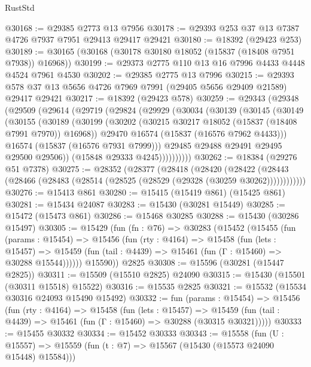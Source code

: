 \begin{lexlean}{RustStd}
\begin{coremodule}
{\begin{coremodule}
{{{{{{{{{{{{{{{{{{{{{{{{{{{{{{{{{{{{{{{{{{{{{{{{{{{{{{{{{{{{@30168 := @29385 @2773 @13 @7956
@30178 := @29393 @253 @37 @13 @7387 @4726 @7937 @7951 @29413 @29417 @29421
@30180 := @18392 (@29423 @253)
@30189 := @30165 (@30168 (@30178 @30180 @18052 (@15837 (@18408 @7951 @7938)) @16968))
@30199 := @29373 @2775 @110 @13 @16 @7996 @4433 @4448 @4524 @7961 @4530
@30202 := @29385 @2775 @13 @7996
@30215 := @29393 @578 @37 @13 @5656 @4726 @7969 @7991 (@29405 @5656 @29409 @21589) @29417 @29421
@30217 := @18392 (@29423 @578)
@30259 := @29343
    (@29348
      (@29509
        (@29614
          (@29719
            (@29824
              (@29929
                (@30034
                  (@30139
                    (@30145
                      (@30149
                        (@30155
                          (@30189
                            (@30199
                              (@30202 (@30215 @30217 @18052 (@15837 (@18408 @7991 @7970)) @16968))
                              @29470
                              @16574
                              (@15837 (@16576 @7962 @4433)))
                            @16574
                            (@15837 (@16576 @7931 @7999)))
                          @29485
                          @29488
                          @29491
                          @29495
                          @29500
                          @29506))
                      (@15848 @29333 @4245))))))))))
@30262 := @18384 (@29276 @51 @7378)
@30275 := @28352
    (@28377
      (@28418
        (@28420
          (@28422 (@28443 (@28466 (@28483 (@28514 (@28525 (@28529 (@29328 (@30259 @30262))))))))))))
@30276 := @15413 @861
@30280 := @15415 (@15419 @861) (@15425 @861)
@30281 := @15434 @24087
@30283 := @15430 (@30281 @15449)
@30285 := @15472 (@15473 @861)
@30286 := @15468 @30285
@30288 := @15430 (@30286 @15497)
@30305 := @15429
    (fun (fn : @76) =>
    @30283
      (@15452
        (@15455
          (fun (params : @15454) =>
          @15456
            (fun (rty : @4164) =>
            @15458
              (fun (lets : @15457) =>
              @15459 (fun (tail : @4439) => @15461 (fun (Γ : @15460) => @30288 @15544))))))
        @15590))
    @2825
@30308 := @15596 (@30281 (@15447 @2825))
@30311 := @15509 (@15510 @2825) @24090
@30315 := @15430 (@15501 (@30311 @15518) @15522)
@30316 := @15535 @2825
@30321 := @15532 (@15534 @30316 @24093 @15490 @15492)
@30332 := fun (params : @15454) =>
  @15456
    (fun (rty : @4164) =>
    @15458
      (fun (lets : @15457) =>
      @15459 (fun (tail : @4439) => @15461 (fun (Γ : @15460) => @30288 (@30315 @30321)))))
@30333 := @15455 @30332
@30334 := @15452 @30333
@30343 := @15558
    (fun (U : @15557) => @15559 (fun (t : @7) => @15567 (@15430 (@15573 @24090 @15448) @15584)))
}}}}}}}}}}}}}}}}}}}}}}}}}}}}}}}}}}}}}}}}}}}}}}}}}}}}}}}}}}}}
\end{coremodule}}
\end{coremodule}
\end{lexlean}
